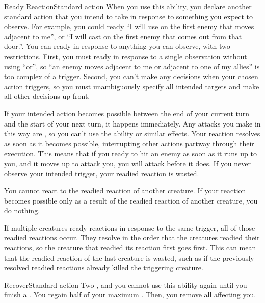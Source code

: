   \begin{activeability}{Ready Reaction}{Standard action}
    \rankline
    When you use this ability, you declare another standard action that you intend to take in response to something you expect to observe.
    For example, you could ready ``I will use  on the first enemy that moves adjacent to me'', or ``I will cast  on the first enemy that comes out from that door.''.
    You can ready in response to anything you can observe, with two restrictions.
    First, you must ready in response to a single observation without using ``or'', so ``an enemy moves adjacent to me or adjacent to one of my allies'' is too complex of a trigger.
    Second, you can't make any decisions when your chosen action triggers, so you must unambiguously specify all intended targets and make all other decisions up front.

    If your intended action becomes possible between the end of your current turn and the start of your next turn, it happens immediately.
    Any attacks you make in this way are , so you can't use the  ability or similar effects.
    Your reaction resolves as soon as it becomes possible, interrupting other actions partway through their execution.
    This means that if you ready to hit an enemy as soon as it runs up to you, and it moves up to attack you, you will attack before it does.
    If you never observe your intended trigger, your readied reaction is wasted.

    You cannot react to the readied reaction of another creature.
    If your reaction becomes possible only as a result of the readied reaction of another creature, you do nothing.

    If multiple creatures ready reactions in response to the same trigger, all of those readied reactions occur.
    They resolve in the order that the creatures readied their reactions, so the creature that readied its reaction first goes first.
    This can mean that the readied reaction of the last creature is wasted, such as if the previously resolved readied reactions already killed the triggering creature.
  \end{activeability}

  \begin{activeability}{Recover}{Standard action}
    \abilitycost Two , and you cannot use this ability again until you finish a .
    \rankline
    You regain half of your maximum .
    Then, you remove all  affecting you.
  \end{activeability}

